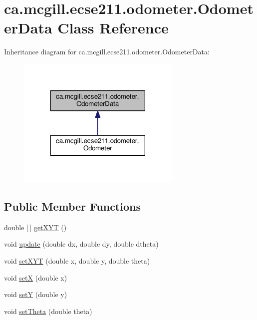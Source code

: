 \hypertarget{classca_1_1mcgill_1_1ecse211_1_1odometer_1_1_odometer_data}{}\section{ca.\+mcgill.\+ecse211.\+odometer.\+Odometer\+Data Class Reference}
\label{classca_1_1mcgill_1_1ecse211_1_1odometer_1_1_odometer_data}


Inheritance diagram for ca.\+mcgill.\+ecse211.\+odometer.\+Odometer\+Data\+:\nopagebreak
\begin{figure}[H]
\begin{center}
\leavevmode
\includegraphics[width=222pt]{classca_1_1mcgill_1_1ecse211_1_1odometer_1_1_odometer_data__inherit__graph}
\end{center}
\end{figure}
\subsection*{Public Member Functions}
\begin{DoxyCompactItemize}
\item 
double \mbox{[}$\,$\mbox{]} \hyperlink{classca_1_1mcgill_1_1ecse211_1_1odometer_1_1_odometer_data_a8f40f0264c68f0cbed4fff1723ae7863}{get\+X\+YT} ()
\item 
void \hyperlink{classca_1_1mcgill_1_1ecse211_1_1odometer_1_1_odometer_data_aaa06f190d634299fcb1b97a1891dad85}{update} (double dx, double dy, double dtheta)
\item 
void \hyperlink{classca_1_1mcgill_1_1ecse211_1_1odometer_1_1_odometer_data_a2ebc18a13aea6276122d9ef4ee100bb9}{set\+X\+YT} (double x, double y, double theta)
\item 
void \hyperlink{classca_1_1mcgill_1_1ecse211_1_1odometer_1_1_odometer_data_a2911d7215e47f3064defe016b46bfeef}{setX} (double x)
\item 
void \hyperlink{classca_1_1mcgill_1_1ecse211_1_1odometer_1_1_odometer_data_a82986438cd462e66520bc62bb4bd2b75}{setY} (double y)
\item 
void \hyperlink{classca_1_1mcgill_1_1ecse211_1_1odometer_1_1_odometer_data_a419b8f07c2c5374411c8e62298e9a402}{set\+Theta} (double theta)
\end{DoxyCompactItemize}
